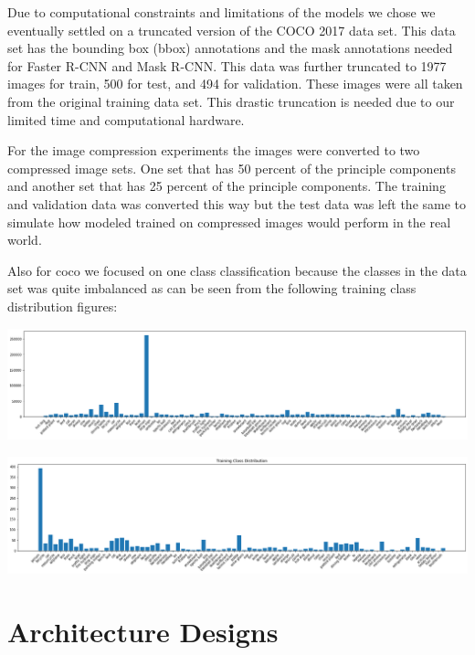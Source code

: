 \documentclass[10pt,twocolumn,letterpaper]{article}
\begin{document}
Due to computational constraints and limitations of the models we chose we eventually settled on a truncated version of the COCO 2017 data set. This data set has the bounding box (bbox) annotations and the mask annotations needed for Faster R-CNN and Mask R-CNN. This data was further truncated to 1977 images for train, 500 for test, and 494 for validation. These images were all taken from the original training data set. This drastic truncation is needed due to our limited time and computational hardware.  

For the image compression experiments the images were converted to two compressed image sets. One set that has 50 percent of the principle components and another set that has 25 percent of the principle components. The training and validation data was converted this way but the test data was left the same to simulate how modeled trained on compressed images would perform in the real world. 

Also for coco we focused on one class classification because the classes in the data set was quite imbalanced as can be seen from the following training class distribution figures:

\includegraphics[width=0.8\linewidth]{docs/latex/images/brandon/coco17_train.png}

\includegraphics[width=0.8\linewidth]{docs/latex/images/brandon/coco17_train_trunc.png}


\section{Architecture Designs}
\end{document}
